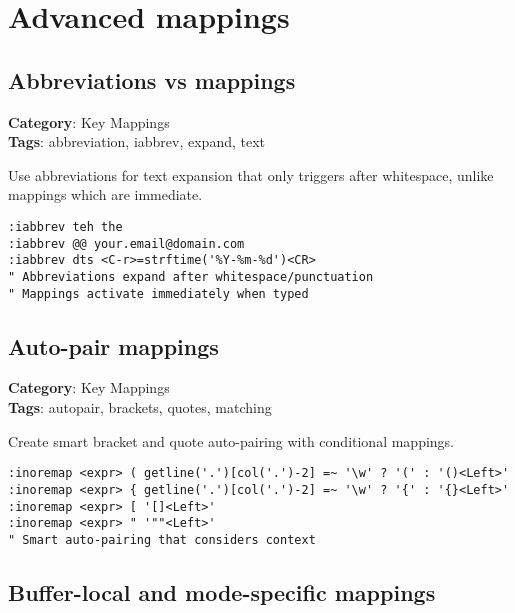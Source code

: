 \chapter{Advanced mappings}
\section{Abbreviations vs mappings}

\textbf{Category}: Key Mappings\\ \textbf{Tags}: abbreviation, iabbrev, expand, text
\vspace{0.5cm}

Use abbreviations for text expansion that only triggers after whitespace, unlike mappings which are immediate.

\begin{Exa*}{}
\begin{Verbatim}[fontsize=\footnotesize, breaklines, breakanywhere]
:iabbrev teh the
:iabbrev @@ your.email@domain.com
:iabbrev dts <C-r>=strftime('%Y-%m-%d')<CR>
" Abbreviations expand after whitespace/punctuation
" Mappings activate immediately when typed
\end{Verbatim}
\end{Exa*}

\section{Auto-pair mappings}

\textbf{Category}: Key Mappings\\ \textbf{Tags}: autopair, brackets, quotes, matching
\vspace{0.5cm}

Create smart bracket and quote auto-pairing with conditional mappings.

\begin{Exa*}{}
\begin{Verbatim}[fontsize=\footnotesize, breaklines, breakanywhere]
:inoremap <expr> ( getline('.')[col('.')-2] =~ '\w' ? '(' : '()<Left>'
:inoremap <expr> { getline('.')[col('.')-2] =~ '\w' ? '{' : '{}<Left>'
:inoremap <expr> [ '[]<Left>'
:inoremap <expr> " '""<Left>'
" Smart auto-pairing that considers context
\end{Verbatim}
\end{Exa*}

\section{Buffer-local and mode-specific mappings}


